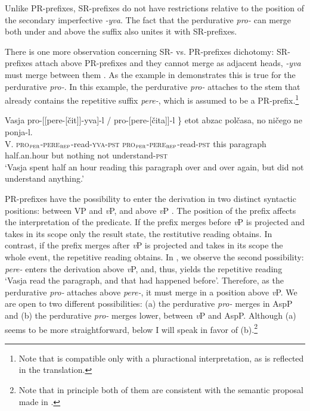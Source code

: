 \documentclass[output=paper,
]{langscibook}
\begin{document}
\noindent Unlike PR-prefixes, SR-prefixes do not have restrictions relative to the position of the secondary imperfective \textit{-yva}. The fact that the perdurative \textit{pro-} can merge both under and above the suffix also unites it with SR-prefixes.


There is one more observation concerning SR- vs. PR-prefixes dichotomy: SR-prefixes attach above PR-prefixes and they cannot merge as adjacent heads, \textit{-yva} must merge between them \citep{tatevosov2009mnozestvennaja,tatevosov2013mnozestvennaja}. As the example in  demonstrates this is true for the perdurative \textit{pro-}. In this example, the perdurative \textit{pro-} attaches to the stem that already contains the repetitive suffix \textit{pere-}, which is assumed to be a PR-prefix.\footnote{Note that  is compatible only with a pluractional interpretation, as is reflected in the translation.}

\ea \label{ex:naumov:18}
\gll Vasja	\minsp{\{} pro-[[pere-[čit]]-yva]-l / \minsp{*} pro-[pere-[čita]]-l	\} etot	abzac polčasa,	no 	ničego		ne	ponja-l. \\
V. {} \textsc{pro}$_\textsc{per}$-\textsc{pere}$_\textsc{rep}$-read-\textsc{yva}-\textsc{pst} {} {} \textsc{pro}$_\textsc{per}$-\textsc{pere}$_\textsc{rep}$-read-\textsc{pst}		{} 	this	paragraph	half.an.hour	but	nothing	not	understand-\textsc{pst} \\
\glt `Vasja spent half an hour reading this paragraph over and over again, but did not understand anything.'
\z

\noindent PR-prefixes have the possibility to enter the derivation in two distinct syntactic positions: between VP and \textit{v}P, and above \textit{v}P \citep{tatevosov2008intermediate}. The position of the prefix affects the interpretation of the predicate. If the prefix merges before \textit{v}P is projected and takes in its scope only the result state, the restitutive reading obtains. In contrast, if the prefix merges after \textit{v}P is projected and takes in its scope the whole event, the repetitive reading obtains. In , we observe the second possibility: \textit{pere-} enters the derivation above \textit{v}P, and, thus, yields the repetitive reading `Vasja read the paragraph, and that had happened before'. Therefore, as the perdurative \textit{pro-} attaches above \textit{pere-}, it must merge in a position above \textit{v}P. We are open to two different possibilities: (a) the perdurative \textit{pro-} merges in AspP and (b) the perdurative \textit{pro-} merges lower, between \textit{v}P and AspP. Although (a) seems to be more straightforward, below I will speak in favor of (b).\footnote{Note that in principle both of them are consistent with the semantic proposal made in .}
\end{document}
